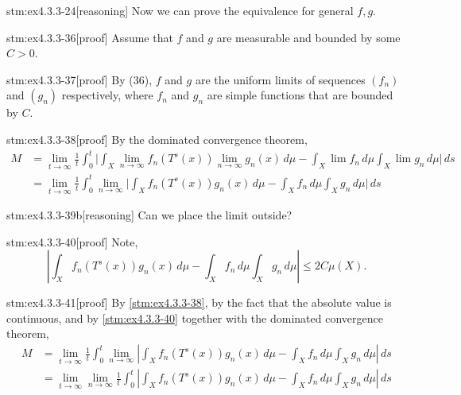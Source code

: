 \begin{stm}{stm:ex4.3.3-24}[reasoning]
Now we can prove the equivalence for general $f, g$.
\end{stm}

\begin{stm}{stm:ex4.3.3-36}[proof]
Assume that $f$ and $g$ are measurable and bounded by some $C > 0$. 
\end{stm}

\begin{stm}{stm:ex4.3.3-37}[proof]
By (36), $f$ and $g$ are the uniform limits of sequences $(f_n)$ and $(g_n)$ respectively, where $f_n$ and $g_n$ are simple functions that are bounded by $C$.
\end{stm}

\begin{stm}{stm:ex4.3.3-38}[proof]
By the dominated convergence theorem,
\begin{align*}
M &= \lim_{t \to \infty} \frac{1}{t} \int_0^t 
\Big| \int_X \lim_{n \to \infty} f_n(T^s(x)) \lim_{n \to \infty} g_n(x) \, d\mu 
- \int_X \lim f_n \, d\mu \int_X \lim g_n \, d\mu \Big| \, ds \\
&= \lim_{t \to \infty} \frac{1}{t} \int_0^t 
\lim_{n \to \infty} 
\Big| \int_X f_n(T^s(x)) g_n(x) \, d\mu 
- \int_X f_n \, d\mu \int_X g_n \, d\mu \Big| \, ds
\end{align*}
\end{stm}

\begin{stm}{stm:ex4.3.3-39b}[reasoning]
Can we place the limit outside?
\end{stm}

\begin{stm}{stm:ex4.3.3-40}[proof]
Note,
\[
\left| \int_X f_n(T^s(x)) g_n(x) \, d\mu 
- \int_X f_n \, d\mu \int_X g_n \, d\mu \right| \leq 2C \mu(X).
\]

\end{stm}

\begin{stm}{stm:ex4.3.3-41}[proof]
By \ref{stm:ex4.3.3-38}, by the fact that the absolute value is continuous, and by \ref{stm:ex4.3.3-40} together with the  dominated convergence theorem,
\begin{align*}
M
&= \lim_{t \to \infty} \frac{1}{t} \int_0^t 
\lim_{n \to \infty} 
\left| \int_X f_n(T^s(x)) g_n(x) \, d\mu 
- \int_X f_n \, d\mu \int_X g_n \, d\mu \right| \, ds \\
&= \lim_{t \to \infty} \lim_{n \to \infty} \frac{1}{t} \int_0^t 
\left| \int_X f_n(T^s(x)) g_n(x) \, d\mu 
- \int_X f_n \, d\mu \int_X g_n \, d\mu \right| \, ds
\end{align*}
\end{stm}

